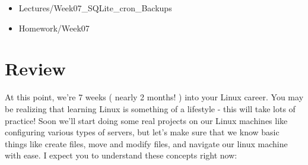 \documentclass[12pt,a4paper]{article}
\begin{document}
\begin{itemize}
\item Lectures/Week07\_SQLite\_cron\_Backups
\item Homework/Week07
\end{itemize}

\section{Review}

At this point, we're 7 weeks ( nearly 2 months! ) into your Linux career. You
may be realizing that learning Linux is something of a lifestyle - this will
take lots of practice! Soon we'll start doing some real projects on our Linux
machines like configuring various types of servers, but let's make sure that we
know basic things like create files, move and modify files, and navigate our
linux machine with ease.
 I expect you to understand these concepts right
now:
\end{document}
